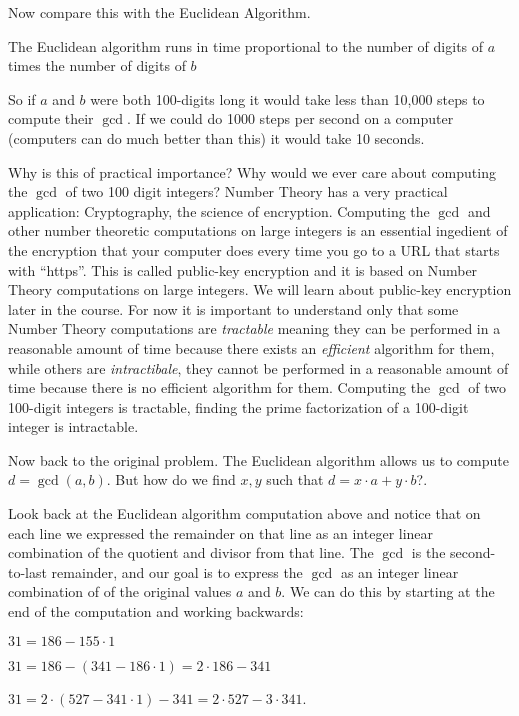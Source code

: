 \documentclass[oneside,12pt]{amsart}
\begin{document}
Now compare this with the Euclidean Algorithm.

\begin{theorem}
The Euclidean algorithm runs in time proportional to the number of digits of $a$ times the number of digits of $b$
\end{theorem}
So if $a$ and $b$ were both 100-digits long it would take less than 10,000 steps to compute their $\gcd$. If we could do 1000 steps per second on a computer
(computers can do much better than this) it would take 10 seconds.

Why is this of practical importance? Why would we ever care about computing the $\gcd$ of two 100 digit integers? Number Theory has a very practical application: Cryptography,
the science of encryption. Computing the $\gcd$ and other number theoretic computations on large integers is an essential ingedient of the encryption that
your computer does every time you go to a URL that starts with ``https''. This is called public-key encryption and it is based on Number Theory computations on large integers.
We will learn about public-key encryption later in the course. For now it is important to understand only that some Number Theory computations are \emph{tractable} meaning
they can be performed in a reasonable amount of time because there exists an \emph{efficient} algorithm for them, while others are \emph{intractibale}, they cannot be
performed in a reasonable amount of time because there is no efficient algorithm for them. Computing the $\gcd$ of two 100-digit integers is tractable, finding the
prime factorization of a 100-digit integer is intractable.

Now back to the original problem. The Euclidean algorithm allows us to compute $d=\gcd(a,b)$. But how do we find $x,y$ such that $d=x\cdot a + y \cdot b$?.

Look back at the Euclidean algorithm computation above and notice that on each line we
expressed the remainder on that line as an integer linear combination of the
quotient and divisor from that line.
The $\gcd$ is the second-to-last remainder, and our goal is to express the $\gcd$
as an integer linear combination of of the original values $a$ and $b$. We can
do this by starting at the end of the computation and working backwards:


\bigskip

$31 = 186 - 155 \cdot 1$

$31 = 186 - (341 - 186 \cdot 1) = 2 \cdot 186 - 341$

$31 = 2 \cdot (527 - 341\cdot 1) - 341 = 2\cdot 527 - 3\cdot 341$.
\end{document}
